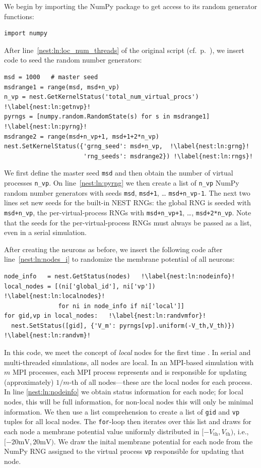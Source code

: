 \documentclass{article}
\begin{document}
We begin by importing the NumPy package to get access to its random
generator functions:
\begin{lstlisting}[numbers=none]
import numpy
\end{lstlisting}
After line~\ref{nest:ln:loc_num_threads} of the original script (cf.\
p.~\pageref{nest:ln:loc_num_threads}), we insert code to seed the
random number generators: 
\begin{lstlisting}[name=brunel-rand]
msd = 1000   # master seed
msdrange1 = range(msd, msd+n_vp)
n_vp = nest.GetKernelStatus('total_num_virtual_procs') !\label{nest:ln:getnvp}!
pyrngs = [numpy.random.RandomState(s) for s in msdrange1] !\label{nest:ln:pyrng}!
msdrange2 = range(msd+n_vp+1, msd+1+2*n_vp)
nest.SetKernelStatus({'grng_seed': msd+n_vp,  !\label{nest:ln:grng}!
                      'rng_seeds': msdrange2}) !\label{nest:ln:rngs}!
\end{lstlisting}
We first define the master seed \lstinline!msd! and then obtain the number of
virtual processes \lstinline!n_vp!.  On line~\ref{nest:ln:pyrng} we
then create a list of \lstinline!n_vp!  NumPy random number generators
with seeds \lstinline!msd!, \lstinline!msd+1!, \dots
\lstinline!msd+n_vp-1!. The next two lines set new seeds for the
built-in NEST RNGs: the global RNG is seeded with
\lstinline!msd+n_vp!, the per-virtual-process RNGs with
\lstinline!msd+n_vp+1!, \dots, \lstinline!msd+2*n_vp!. Note that the
seeds for the per-virtual-process RNGs must always be passed as a
list, even in a serial simulation.

After creating the neurons as before, we insert the following code
after line~\ref{nest:ln:nodes_i} to randomize the membrane potential
of all neurons:
\begin{lstlisting}[name=brunel-rand]
node_info   = nest.GetStatus(nodes)   !\label{nest:ln:nodeinfo}!
local_nodes = [(ni['global_id'], ni['vp'])   !\label{nest:ln:localnodes}!
               for ni in node_info if ni['local']]
for gid,vp in local_nodes:   !\label{nest:ln:randvmfor}!
  nest.SetStatus([gid], {'V_m': pyrngs[vp].uniform(-V_th,V_th)}) !\label{nest:ln:randvm}!
\end{lstlisting}
In this code, we meet the concept of \emph{local} nodes for the first
time \citep{Ples:2007(672)}. In serial and multi-threaded
simulations, all nodes are local. In an MPI-based simulation with $m$
MPI processes, each MPI process represents and is responsible for
updating (approximately) $1/m$-th of all nodes---these are the local
nodes for each process. In line \ref{nest:ln:nodeinfo} we obtain status 
information for each node; for local nodes, this will be full information, 
for non-local nodes this will only be minimal information. We then use a list
 comprehension to create
a list of \lstinline!gid! and \lstinline!vp! tuples for all local
nodes. The \lstinline!for!-loop then iterates over this list and draws
for each node a membrane potential value uniformly distributed in
$[-V_{\text{th}}, V_{\text{th}})$, i.e., $[-20\text{mV},
20\text{mV})$. We draw the inital membrane potential for each node
from the NumPy RNG assigned to the virtual process \lstinline!vp!
responsible for updating that node.
\end{document}
